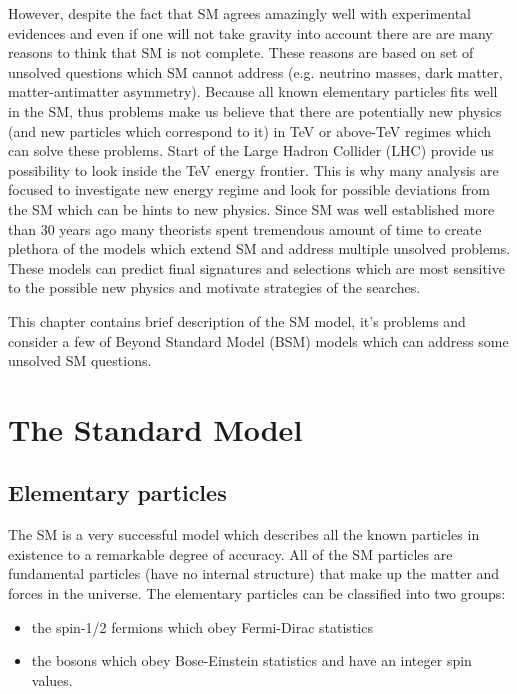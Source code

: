 However, despite the fact that SM agrees amazingly well with experimental evidences and even if one will not take gravity into account 
there are are many reasons to think that SM is not complete.
These reasons are based on set of unsolved questions which SM cannot address (e.g. neutrino masses, dark matter, matter-antimatter asymmetry).
Because all known elementary particles fits well in the SM, thus problems make us believe that there are
potentially new physics (and new particles which correspond to it) in TeV or above-TeV regimes which can solve these problems.
Start of the Large Hadron Collider (LHC) provide us possibility to look inside the TeV energy frontier.
This is why many analysis are focused to investigate new energy regime and look for possible deviations from the SM which can be hints to new physics.
Since SM was well established more than 30 years ago many theorists spent tremendous amount of time to create
plethora of the models which extend SM and address multiple unsolved problems. These models can predict final signatures and selections which are most sensitive to 
the possible new physics and motivate strategies of the searches.

This chapter contains brief description of the SM model, it's problems and consider a few of Beyond Standard Model (BSM) models which can address some unsolved SM questions.

\section{The Standard Model}

\subsection{Elementary particles}


The SM is a very successful model which describes all the known particles in existence to a remarkable degree of accuracy.
All of the SM particles are fundamental particles (have no internal structure) that make up the matter and forces in the universe.
The elementary particles can be classified into two groups: 
\begin{itemize}
 \item the spin-1/2 fermions which obey Fermi-Dirac statistics
 \item the bosons which obey Bose-Einstein statistics and have an integer spin values.
\end{itemize}

